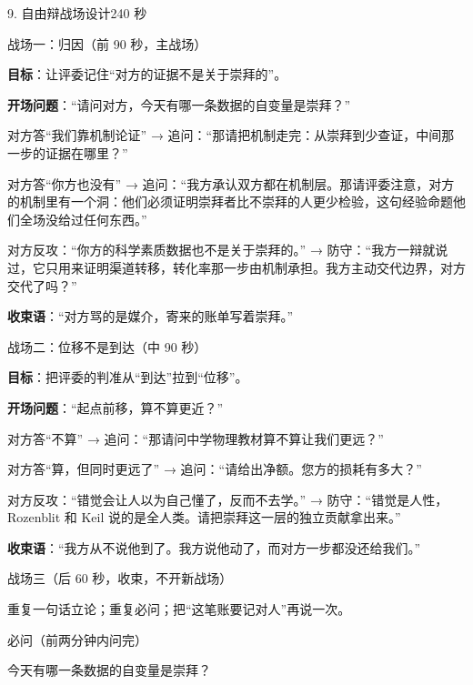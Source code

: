 \documentclass[script,pro]{debate}
\begin{document}
\begin{stage}{9. 自由辩战场设计}{240 秒}
\begin{battleground}{战场一：归因（前 90 秒，主战场）}
\begin{bullets}
\item \textbf{目标}：让评委记住“对方的证据不是关于崇拜的”。
\item \textbf{开场问题}：“请问对方，今天有哪一条数据的自变量是崇拜？”
\item 对方答“我们靠机制论证” → 追问：“那请把机制走完：从崇拜到少查证，中间那一步的证据在哪里？”
\item 对方答“你方也没有” → 追问：“我方承认双方都在机制层。那请评委注意，对方的机制里有一个洞：他们必须证明崇拜者比不崇拜的人更少检验，这句经验命题他们全场没给过任何东西。”
\item 对方反攻：“你方的科学素质数据也不是关于崇拜的。” → 防守：“我方一辩就说过，它只用来证明渠道转移，转化率那一步由机制承担。我方主动交代边界，对方交代了吗？”
\item \textbf{收束语}：“对方骂的是媒介，寄来的账单写着崇拜。”
\end{bullets}
\end{battleground}
\begin{battleground}{战场二：位移不是到达（中 90 秒）}
\begin{bullets}
\item \textbf{目标}：把评委的判准从“到达”拉到“位移”。
\item \textbf{开场问题}：“起点前移，算不算更近？”
\item 对方答“不算” → 追问：“那请问中学物理教材算不算让我们更远？”
\item 对方答“算，但同时更远了” → 追问：“请给出净额。您方的损耗有多大？”
\item 对方反攻：“错觉会让人以为自己懂了，反而不去学。” → 防守：“错觉是人性，Rozenblit 和 Keil 说的是全人类。请把崇拜这一层的独立贡献拿出来。”
\item \textbf{收束语}：“我方从不说他到了。我方说他动了，而对方一步都没还给我们。”
\end{bullets}
\end{battleground}
\begin{battleground}{战场三（后 60 秒，收束，不开新战场）}
\begin{bullets}
\item 重复一句话立论；重复必问；把“这笔账要记对人”再说一次。
\end{bullets}
\begin{points}{必问（前两分钟内问完）}
\item 今天有哪一条数据的自变量是崇拜？

\end{points}
\end{battleground}
\end{stage}
\end{document}
